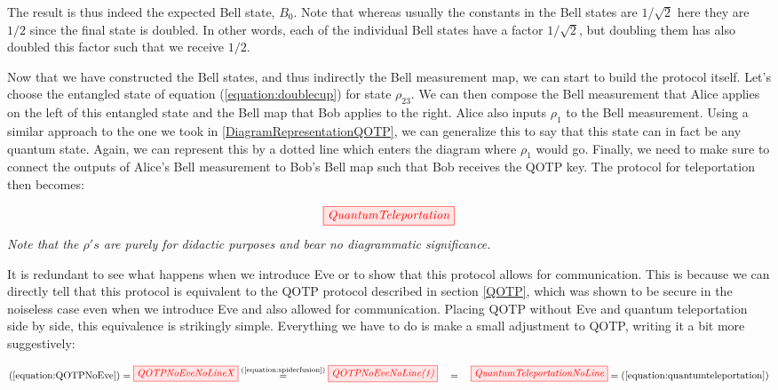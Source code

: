 \documentclass[]{article}
\newcommand{\equaltext}[1]{\ensuremath{\stackrel{\text{#1}}{=}}}
\begin{document}
The result is thus indeed the expected Bell state, $B_0$. Note that whereas usually the constants in the Bell states are $1/\sqrt{2}$ here they are $1/2$ since the final state is doubled. In other words, each of the individual Bell states have a factor $1/\sqrt{2}$, but doubling them has also doubled this factor such that we receive $1/2$.

Now that we have constructed the Bell states, and thus indirectly the Bell measurement map, we can start to build the protocol itself. Let's choose the entangled state of equation (\ref{equation:doublecup}) for state $\rho_{23}$. We can then compose the Bell measurement that Alice applies on the left of this entangled state and the Bell map that Bob applies to the right. Alice also inputs $\rho_1$ to the Bell measurement. Using a similar approach to the one we took in \ref{DiagramRepresentationQOTP}, we can generalize this to say that this state can in fact be any quantum state. Again, we can represent this by a dotted line which enters the diagram where $\rho_1$ would go. Finally, we need to make sure to connect the outputs of Alice's Bell measurement to Bob's Bell map such that Bob receives the QOTP key. The protocol for teleportation then becomes: 
 
\begin{equation}
	\label{equation:quantumteleportation}
	\tikzfig{QuantumTeleportation}
\end{equation}
\textit{Note that the $\rho's$ are purely for didactic purposes and bear no diagrammatic significance.}

It is redundant to see what happens when we introduce Eve or to show that this protocol allows for communication. This is because we can directly tell that this protocol is equivalent to the QOTP protocol described in section \ref{QOTP}, which was shown to be secure in the noiseless case even when we introduce Eve and also allowed for communication. Placing QOTP without Eve and quantum teleportation side by side, this equivalence is strikingly simple. Everything we have to do is make a small adjustment to QOTP, writing it a bit more suggestively:

\begin{equation}
\label{equation:QOTPQuantumTeleportationEquivalence} (\ref{equation:QOTPNoEve}) = 
\tikzfig{QOTPNoEveNoLineX} \equaltext{(\ref{equation:spiderfusion})} \tikzfig{QOTPNoEveNoLine(1)}~~~ = ~~~\tikzfig{QuantumTeleportationNoLine} = (\ref{equation:quantumteleportation})
\end{equation}
 
\end{document}
